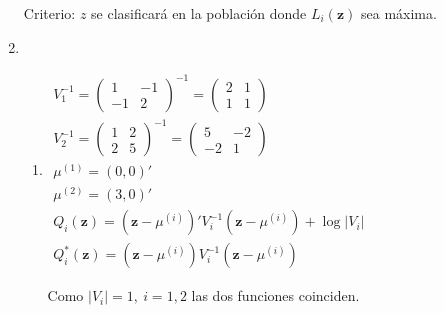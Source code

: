 \begin{enumerate}[label=\color{red}\textbf{\arabic*)}, leftmargin=*]
	Criterio: $z$ se clasificará en la población donde $L_i(\mathbf{z})$ sea máxima.
	
	\item {}
	\begin{enumerate}[label=\color{red}\alph*)]
		\item {}
		
		$\begin{array}{l}
		V_1^{-1}=\begin{pmatrix}
		1 & -1\\
		-1 & 2
		\end{pmatrix}^{-1}=\begin{pmatrix}
		2 & 1\\
		1 & 1
		\end{pmatrix}\\
		V_2^{-1}=\begin{pmatrix}
		1 & 2\\
		2 & 5
		\end{pmatrix}^{-1}=\begin{pmatrix}
		5 & -2\\
		-2 & 1
		\end{pmatrix}\\
		\mu^{(1)}=(0,0)'\\
		\mu^{(2)}=(3,0)'\\
		Q_i(\mathbf{z})=(\mathbf{z}-\mu^{(i)})'V_i^{-1}(\mathbf{z}-\mu^{(i)})+\log|V_i|\\
		Q_i^*(\mathbf{z})=(\mathbf{z}-\mu^{(i)})V_i^{-1}(\mathbf{z}-\mu^{(i)})
		\end{array}$
		
		Como $|V_i|=1,\:i=1,2$ las dos funciones coinciden.
		

\end{enumerate}
\end{enumerate}
